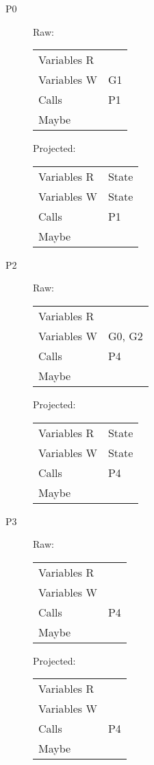 \documentclass{article}
\begin{document}
\begin{description}
\item[P0]
  \begin{multicols}{2}
    Raw:
    \begin{tabular}{ll}
      Variables R & \\
      Variables W & G1 \\
      Calls       & P1 \\
      Maybe       & \\
    \end{tabular}

    Projected:
    \begin{tabular}{ll}
      Variables R & State \\
      Variables W & State \\
      Calls       & P1 \\
      Maybe       & \\
    \end{tabular}
  \end{multicols}

\item[P2]
  \begin{multicols}{2}
    Raw:
    \begin{tabular}{ll}
      Variables R & \\
      Variables W & G0, G2 \\
      Calls       & P4 \\
      Maybe       & \\
    \end{tabular}

    Projected:
    \begin{tabular}{ll}
      Variables R & State \\
      Variables W & State \\
      Calls       & P4 \\
      Maybe       & \\
    \end{tabular}
  \end{multicols}

\item[P3]
  \begin{multicols}{2}
    Raw:
    \begin{tabular}{ll}
      Variables R & \\
      Variables W & \\
      Calls       & P4 \\
      Maybe       & \\
    \end{tabular}

    Projected:
    \begin{tabular}{ll}
      Variables R & \\
      Variables W & \\
      Calls       & P4 \\
      Maybe       & \\
    \end{tabular}
  \end{multicols}
\end{description}
\end{document}
